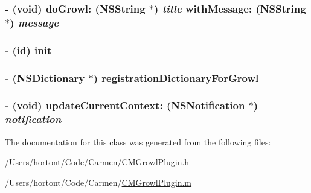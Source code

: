 \hypertarget{interface_c_m_growl_plugin_3b447261269246d5b5c62f9da6fe4400}{
\subsubsection[doGrowl:withMessage:]{\setlength{\rightskip}{0pt plus 5cm}- (void) doGrowl: ({\bf NSString} $\ast$) {\em title}\/ withMessage: ({\bf NSString} $\ast$) {\em message}}}
\label{interface_c_m_growl_plugin_3b447261269246d5b5c62f9da6fe4400}


\hypertarget{interface_c_m_growl_plugin_43466117017daa5170e3b58504289d55}{
\subsubsection[init]{\setlength{\rightskip}{0pt plus 5cm}- (id) init }}
\label{interface_c_m_growl_plugin_43466117017daa5170e3b58504289d55}


\hypertarget{interface_c_m_growl_plugin_31184d5a2ea52bf2de3b1cf05a4c7a4c}{
\subsubsection[registrationDictionaryForGrowl]{\setlength{\rightskip}{0pt plus 5cm}- (NSDictionary $\ast$) registrationDictionaryForGrowl }}
\label{interface_c_m_growl_plugin_31184d5a2ea52bf2de3b1cf05a4c7a4c}


\hypertarget{interface_c_m_growl_plugin_e9890e209bd409c76a2cbcfe07f1a835}{
\subsubsection[updateCurrentContext:]{\setlength{\rightskip}{0pt plus 5cm}- (void) updateCurrentContext: (NSNotification $\ast$) {\em notification}}}
\label{interface_c_m_growl_plugin_e9890e209bd409c76a2cbcfe07f1a835}




The documentation for this class was generated from the following files:\begin{CompactItemize}
\item 
/Users/hortont/Code/Carmen/\hyperlink{_c_m_growl_plugin_8h}{CMGrowlPlugin.h}\item 
/Users/hortont/Code/Carmen/\hyperlink{_c_m_growl_plugin_8m}{CMGrowlPlugin.m}\end{CompactItemize}
